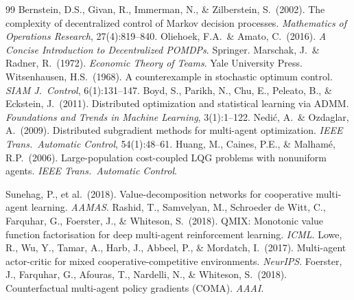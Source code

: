 \documentclass[10pt, letterpaper]{article}
\begin{document}
\begin{thebibliography}{99}
 Bernstein, D.S., Givan, R., Immerman, N., \& Zilberstein, S.\ (2002). The complexity of decentralized control of Markov decision processes. \emph{Mathematics of Operations Research}, 27(4):819--840.
 Oliehoek, F.A.\ \& Amato, C.\ (2016). \emph{A Concise Introduction to Decentralized POMDPs}. Springer.
 Marschak, J.\ \& Radner, R.\ (1972). \emph{Economic Theory of Teams}. Yale University Press.
 Witsenhausen, H.S.\ (1968). A counterexample in stochastic optimum control. \emph{SIAM J.\ Control}, 6(1):131--147.
 Boyd, S., Parikh, N., Chu, E., Peleato, B., \& Eckstein, J.\ (2011). Distributed optimization and statistical learning via ADMM. \emph{Foundations and Trends in Machine Learning}, 3(1):1--122.
 Nedi\'c, A.\ \& Ozdaglar, A.\ (2009). Distributed subgradient methods for multi-agent optimization. \emph{IEEE Trans.\ Automatic Control}, 54(1):48--61.
 Huang, M., Caines, P.E., \& Malham\'e, R.P.\ (2006). Large-population cost-coupled LQG problems with nonuniform agents. \emph{IEEE Trans.\ Automatic Control}.

 Sunehag, P., et al.\ (2018). Value-decomposition networks for cooperative multi-agent learning. \emph{AAMAS}.
 Rashid, T., Samvelyan, M., Schroeder de Witt, C., Farquhar, G., Foerster, J., \& Whiteson, S.\ (2018). QMIX: Monotonic value function factorisation for deep multi-agent reinforcement learning. \emph{ICML}.
 Lowe, R., Wu, Y., Tamar, A., Harb, J., Abbeel, P., \& Mordatch, I.\ (2017). Multi-agent actor-critic for mixed cooperative-competitive environments. \emph{NeurIPS}.
 Foerster, J., Farquhar, G., Afouras, T., Nardelli, N., \& Whiteson, S.\ (2018). Counterfactual multi-agent policy gradients (COMA). \emph{AAAI}.


\end{thebibliography}
\end{document}
